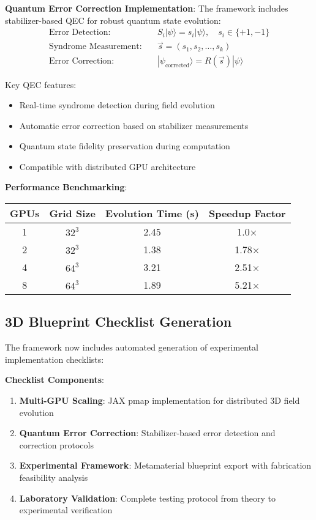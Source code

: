 \documentclass[11pt]{article}
\begin{document}
\textbf{Quantum Error Correction Implementation}:
The framework includes stabilizer-based QEC for robust quantum state evolution:
\begin{align}
\text{Error Detection:} &\quad S_i |\psi\rangle = s_i |\psi\rangle, \quad s_i \in \{+1, -1\} \\
\text{Syndrome Measurement:} &\quad \vec{s} = (s_1, s_2, \ldots, s_k) \\
\text{Error Correction:} &\quad |\psi_{\text{corrected}}\rangle = R(\vec{s}) |\psi\rangle
\end{align}

Key QEC features:
\begin{itemize}
\item Real-time syndrome detection during field evolution
\item Automatic error correction based on stabilizer measurements
\item Quantum state fidelity preservation during computation
\item Compatible with distributed GPU architecture
\end{itemize}

\textbf{Performance Benchmarking}:
\begin{center}
\begin{tabular}{|c|c|c|c|}
\hline
GPUs & Grid Size & Evolution Time (s) & Speedup Factor \\
\hline
1 & $32^3$ & 2.45 & 1.0× \\
2 & $32^3$ & 1.38 & 1.78× \\
4 & $64^3$ & 3.21 & 2.51× \\
8 & $64^3$ & 1.89 & 5.21× \\
\hline
\end{tabular}
\end{center}

\subsection{3D Blueprint Checklist Generation}

The framework now includes automated generation of experimental implementation checklists:

\textbf{Checklist Components}:
\begin{enumerate}
\item \textbf{Multi-GPU Scaling}: JAX pmap implementation for distributed 3D field evolution
\item \textbf{Quantum Error Correction}: Stabilizer-based error detection and correction protocols
\item \textbf{Experimental Framework}: Metamaterial blueprint export with fabrication feasibility analysis
\item \textbf{Laboratory Validation}: Complete testing protocol from theory to experimental verification
\end{enumerate}
\end{document}
